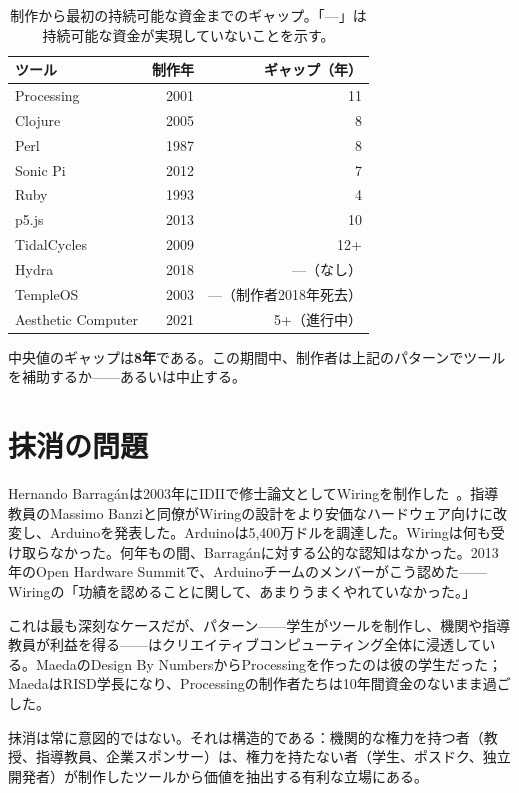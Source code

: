 \documentclass[10pt,letterpaper,twocolumn]{article}
\begin{document}
\begin{table}[h]
\small
\centering
\begin{tabularx}{\columnwidth}{Xrr}
\toprule
\textbf{ツール} & \textbf{制作年} & \textbf{ギャップ（年）} \\
\midrule
Processing & 2001 & 11 \\
Clojure & 2005 & 8 \\
Perl & 1987 & 8 \\
Sonic Pi & 2012 & 7 \\
Ruby & 1993 & 4 \\
p5.js & 2013 & 10 \\
TidalCycles & 2009 & 12+ \\
Hydra & 2018 & ---（なし） \\
TempleOS & 2003 & ---（制作者2018年死去） \\
Aesthetic Computer & 2021 & 5+（進行中） \\
\bottomrule
\end{tabularx}
\caption{制作から最初の持続可能な資金までのギャップ。「---」は持続可能な資金が実現していないことを示す。}
\label{tab:gap}
\end{table}

中央値のギャップは\textbf{8年}である。この期間中、制作者は上記のパターンでツールを補助するか——あるいは中止する。

\section{抹消の問題}

Hernando Barrag\'anは2003年にIDIIで修士論文としてWiringを制作した~\citep{barragan2004wiring}。指導教員のMassimo Banziと同僚がWiringの設計をより安価なハードウェア向けに改変し、Arduinoを発表した。Arduinoは5,400万ドルを調達した。Wiringは何も受け取らなかった。何年もの間、Barrag\'anに対する公的な認知はなかった。2013年のOpen Hardware Summitで、Arduinoチームのメンバーがこう認めた——Wiringの「功績を認めることに関して、あまりうまくやれていなかった。」

これは最も深刻なケースだが、パターン——学生がツールを制作し、機関や指導教員が利益を得る——はクリエイティブコンピューティング全体に浸透している。MaedaのDesign By NumbersからProcessingを作ったのは彼の学生だった；MaedaはRISD学長になり、Processingの制作者たちは10年間資金のないまま過ごした。

抹消は常に意図的ではない。それは構造的である：機関的な権力を持つ者（教授、指導教員、企業スポンサー）は、権力を持たない者（学生、ポスドク、独立開発者）が制作したツールから価値を抽出する有利な立場にある。
\end{document}
